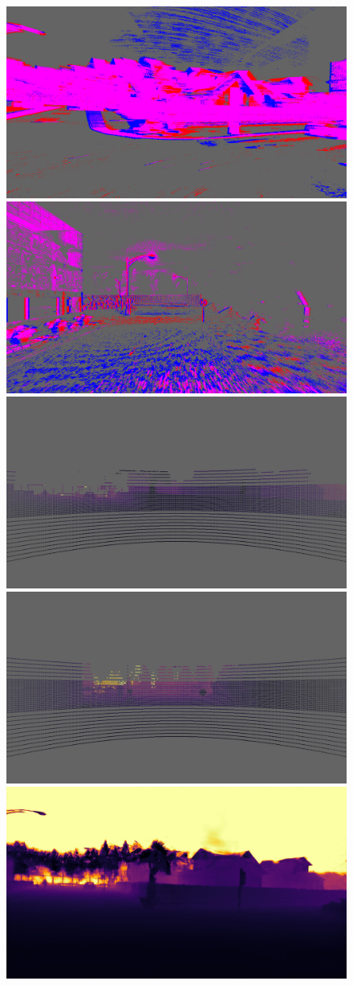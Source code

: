 \begin{figure}
  \centering
  \includegraphics[width=0.475\linewidth]{mainmatter/figures/b_depth_conv/sled_dense_cmp_additional/evts001630_lightgray_fixed.png}
  \includegraphics[width=0.475\linewidth]{mainmatter/figures/b_depth_conv/sled_dense_cmp_additional/evts002216_lightgray_fixed.png}
  \includegraphics[width=0.475\linewidth]{mainmatter/figures/b_depth_conv/sled_dense_cmp_additional/lidar001630_lightgray_fixed.png}
  \includegraphics[width=0.475\linewidth]{mainmatter/figures/b_depth_conv/sled_dense_cmp_additional/lidar002216_lightgray_fixed.png}
  \includegraphics[width=0.475\linewidth]{mainmatter/figures/b_depth_conv/sled_dense_cmp_additional/prev001630.png}

\end{figure}
